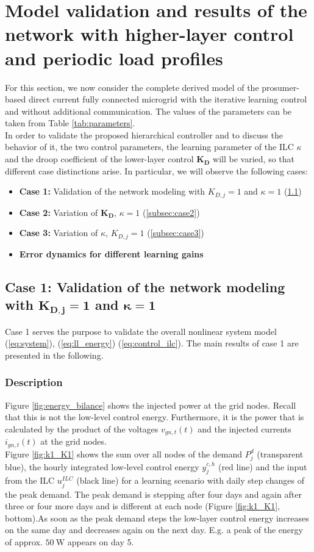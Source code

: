 \section{Model validation and results of the network with higher-layer control and periodic load profiles}
\label{sec:valid_ILC}
For this section, we now consider the complete derived model of the prosumer-based direct current fully connected microgrid with the iterative learning control and without additional communication. The values of the parameters can be taken from Table \ref{tab:parameters}. 
\\In order to validate the proposed hierarchical controller and to discuss the behavior of it, the two control parameters, the learning parameter of the ILC $\kappa$ and the droop coefficient of the lower-layer control $\boldsymbol{K_D}$ will be varied, so that different case distinctions arise. In particular, we will observe the following cases:
\begin{itemize}
	\item \textbf{Case 1:} Validation of the network modeling with $K_{D,j} = 1$ and $\kappa = 1$ (\ref{subsec:case1})
	\item \textbf{Case 2:} Variation of $\boldsymbol{K_D}$, $\kappa = 1$ (\ref{subsec:case2})
	\item \textbf{Case 3:} Variation of $\kappa$, $K_{D,j} = 1$ (\ref{subsec:case3})
	\item \textbf{Error dynamics for different learning gains}
\end{itemize}
\subsection{Case 1: Validation of the network modeling with $\boldsymbol{K_{D,j} = 1}$ and $\boldsymbol{\kappa = 1}$}
\label{subsec:case1}
Case 1 serves the purpose to validate the overall nonlinear system model (\ref{eq:system}), (\ref{eq:ll_energy}) (\ref{eq:control_ilc}). The main results of case 1 are presented in the following.
\subsubsection*{Description}
Figure \ref{fig:energy_bilance} shows the injected power at the grid nodes. Recall that this is not the low-level control energy. Furthermore, it is the power that is calculated by the product of the voltages $v_{gn,t}(t)$ and the injected currents $i_{gn,t}(t)$ at the grid nodes. 
\\Figure \ref{fig:k1_K1} shows the sum over all nodes of the demand $P_j^d$ (transparent blue), the hourly integrated low-level control energy $y_j^{c,h}$ (red line) and the input from the ILC $u_j^{ILC}$ (black line) for a learning scenario with daily step changes of the peak demand. The peak demand is stepping after four days and again after three or four more days  and is different at each node (Figure \ref{fig:k1_K1}, bottom).As soon as the peak demand steps the low-layer control energy increases on the same day and decreases again on the next day. E.g. a peak of the energy of approx. $\SI{50}{\watt}$ appears on day 5. 

